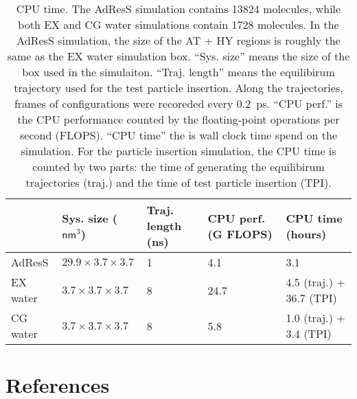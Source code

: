 \documentclass[aip,jcp,a4paper,reprint,onecolumn]{revtex4-1}
\begin{document}
\begin{table}
  \centering
  \begin{tabular}{l|l|l|l|l}
    & Sys. size ($\textsf{nm}^3$)
    & Traj. length (\textsf{ns})
    & CPU perf. (G FLOPS)
    & CPU time (hours)\\    \hline
    AdResS   &$29.9\times3.7\times3.7$ & 1 &  4.1 & 3.1\\
    EX water & $3.7\times3.7\times3.7$ & 8 & 24.7 & 4.5 (traj.) + 36.7 (TPI)\\
    CG water & $3.7\times3.7\times3.7$ & 8 &  5.8 & 1.0 (traj.) + 3.4 (TPI)\\
  \end{tabular}
  \caption{CPU time.
    The AdResS simulation contains 13824 molecules, while both EX and CG
    water simulations contain 1728 molecules. In the AdResS simulation,
    the size of the AT + HY regions is roughly the same as the EX water
    simulation box.
    ``Sys. size'' means the size of the box used in the simulaiton.
    ``Traj. length'' means the equilibirum trajectory
    used for the test particle insertion. Along the trajectories, frames
    of configurations were recoreded every 0.2~\textsf{ps}.
    ``CPU perf.'' is the CPU performance
    counted by the floating-point operations per second (FLOPS).
    ``CPU time'' the is wall clock time spend on the simulation.
    For the particle insertion simulation, the CPU time is counted by two
    parts: the time of generating the equilibirum trajectories (traj.)
    and the time of test particle insertion (TPI).
  }
  \label{tab:tmp1}
\end{table}

\section*{References}
{}

\end{document}

